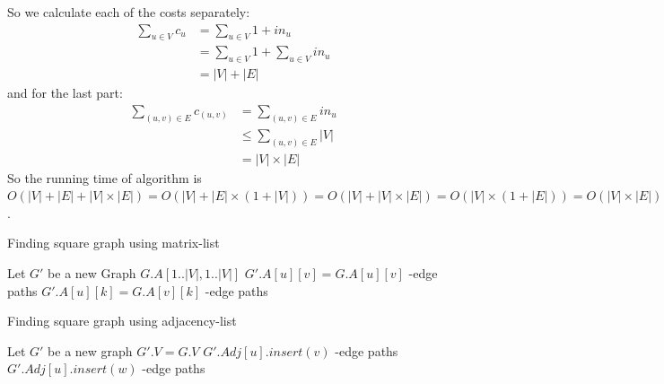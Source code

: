\documentclass{book}
\begin{document}
	So we calculate each of the costs separately:
	\begin{equation*}
		\begin{split}
		\sum_{u \in V}{c_{u}} &= \sum_{u \in V}{1 + in_u} \\
		&= \sum_{u \in V}{1} + \sum_{u \in V}{in_u} \\
		&= |V| + |E|
		\end{split}
	\end{equation*}
	and for the last part:
	\begin{equation*}
		\begin{split}
		\sum_{(u, v) \in E}{c_{(u, v)}}  &= \sum_{(u, v) \in E}{in_u} \\
		&\le \sum_{(u, v) \in E}{|V|} \\
		&= |V| \times |E|
		\end{split}
	\end{equation*}
	So the running time of algorithm is $O(|V| + |E| + |V| \times |E|) = O(|V| + |E| \times (1 + |V|)) = O(|V| + |V| \times |E|) = O(|V| \times (1 + |E|)) = O(|V| \times |E|)$.
	\begin{algorithm*}[h!]
		\caption{Finding square graph using matrix-list}
		\begin{algorithmic}[1]
				\State Let $G'$ be a new Graph
				\Comment $G.A[1..|V|, 1..|V|]$
						\State $G'.A[u][v] = G.A[u][v]$
						-edge paths
								\State $G'.A[u][k] = G.A[v][k]$
								-edge paths
							\EndFor
						\EndIf
					\EndFor
				\EndFor				
			\EndFunction
		\end{algorithmic}
	\end{algorithm*}
	\begin{algorithm*}[h!]
		\caption{Finding square graph using adjacency-list}
		\begin{algorithmic}[1]
				\State Let $G'$	be a new graph
				\State $G'.V = G.V$
				   \label{MakeSquareGraph:all_verticies}
						\State $G'.Adj[u].insert(v)$ \label{MakeSquareGraph:1-path}
						-edge paths
								\label{MakeSquareGraph:2-path:1}
							\State $G'.Adj[u].insert(w)$ \label{MakeSquareGraph:2-path:2}
							-edge paths
						\EndIf
						\EndFor						
					\EndFor
				\EndFor
			\EndFunction
		\end{algorithmic}
	\end{algorithm*}
	\FloatBarrier
\end{document}
